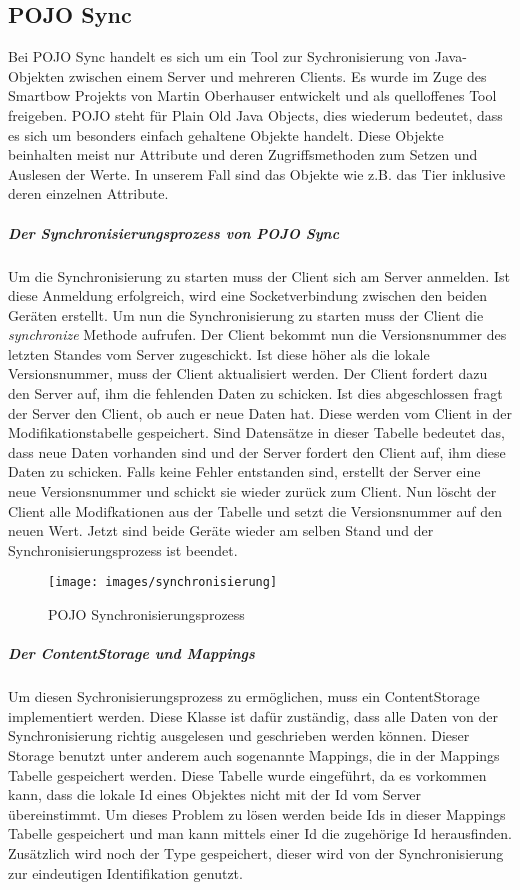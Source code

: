 
\subsection{POJO Sync}
Bei POJO Sync handelt es sich um ein Tool zur Sychronisierung von Java-Objekten zwischen einem Server und mehreren Clients. Es wurde im Zuge des Smartbow Projekts von Martin Oberhauser entwickelt und als quelloffenes Tool freigeben. 
POJO steht für Plain Old Java Objects, dies wiederum bedeutet, dass es sich um besonders einfach gehaltene Objekte handelt. Diese Objekte beinhalten meist nur Attribute und deren Zugriffsmethoden zum Setzen und Auslesen der Werte. In unserem Fall sind das Objekte wie z.B. das Tier inklusive deren einzelnen Attribute.

\subparagraph{Der Synchronisierungsprozess von POJO Sync}

Um die Synchronisierung zu starten muss der Client sich am Server anmelden. Ist diese Anmeldung erfolgreich, wird eine Socketverbindung zwischen den beiden Geräten erstellt. Um nun die Synchronisierung zu starten muss der Client die \textit{synchronize} Methode aufrufen. Der Client bekommt nun die Versionsnummer des letzten Standes vom Server zugeschickt. Ist diese höher als die lokale Versionsnummer, muss der Client aktualisiert werden. Der Client fordert dazu den Server auf, ihm die fehlenden Daten zu schicken. Ist dies abgeschlossen fragt der Server den Client, ob auch er neue Daten hat. Diese werden vom Client in der Modifikationstabelle gespeichert. Sind Datensätze in dieser Tabelle bedeutet das, dass neue Daten vorhanden sind und der Server fordert den Client auf, ihm diese Daten zu schicken. Falls keine Fehler entstanden sind, erstellt der Server eine neue Versionsnummer und schickt sie wieder zurück zum Client. Nun löscht der Client alle Modifkationen aus der Tabelle und setzt die Versionsnummer auf den neuen Wert. Jetzt sind beide Geräte wieder am selben Stand und der Synchronisierungsprozess ist beendet.

\begin{figure}[htbp]
\centering
    \texttt{[image: images/synchronisierung]}
\caption{POJO Synchronisierungsprozess}
\end{figure}
\newpage

\subparagraph{Der ContentStorage und Mappings}
Um diesen Sychronisierungsprozess zu ermöglichen, muss ein ContentStorage implementiert werden. Diese Klasse ist dafür zuständig, dass alle Daten von der Synchronisierung richtig ausgelesen und geschrieben werden können.
Dieser Storage benutzt unter anderem auch sogenannte Mappings, die in der Mappings Tabelle gespeichert werden. Diese Tabelle wurde eingeführt, da es vorkommen kann, dass die lokale Id eines Objektes nicht mit der Id vom Server übereinstimmt. Um dieses Problem zu lösen werden beide Ids in dieser Mappings Tabelle gespeichert und man kann mittels einer Id die zugehörige Id herausfinden. Zusätzlich wird noch der Type gespeichert, dieser wird von der Synchronisierung zur eindeutigen Identifikation genutzt.



